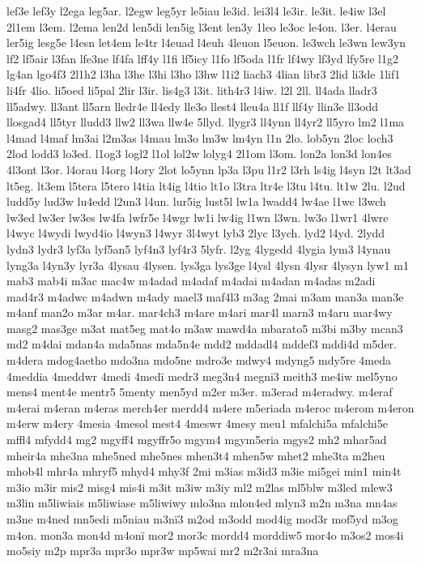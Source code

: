 {lef3e
lef3y
l2ega
leg5ar.
l2egw
leg5yr
le5iau
le3id.
lei3l4
le3ir.
le3it.
le4iw
l3el
2l1em
l3em.
l2ema
len2d
len5di
len5ig
l3ent
len3y
1leo
le3oc
le4on.
l3er.
l4erau
ler5ig
lesg5e
l4esn
let4em
le4tr
l4euad
l4euh
4leuon
l5euon.
le3wch
le3wn
lew3yn
lf2
lf5air
l3fan
lfe3ne
lf4fa
lff4y
l1fi
lf5icy
l1fo
lf5oda
l1fr
lf4wy
lf3yd
lfy5re
l1g2
lg4an
lgo4f3
2l1h2
l3ha
l3he
l3hi
l3ho
l3hw
l1i2
liach3
4lian
libr3
2lid
li3de
1lif1
li4fr
4lio.
li5oed
li5pal
2lir
l3ir.
lis4g3
l3it.
lith4r3
l4iw.
l2l
2ll.
ll4ada
lladr3
ll5adwy.
ll3ant
ll5arn
lledr4e
ll4edy
lle3o
llest4
lleu4a
ll1f
llf4y
llin3e
ll3odd
llosgad4
ll5tyr
lludd3
llw2
ll3wa
llw4e
5llyd.
llygr3
ll4ynn
ll4yr2
ll5yro
lm2
l1ma
l4mad
l4maf
lm3ai
l2m3as
l4mau
lm3o
lm3w
lm4yn
l1n
2lo.
lob5yn
2loc
loch3
2lod
lodd3
lo3ed.
l1og3
logl2
l1ol
lol2w
lolyg4
2l1om
l3om.
lon2a
lon3d
lon4es
4l3ont
l3or.
l4orau
l4org
l4ory
2lot
lo5ynn
lp3a
l3pu
l1r2
l3rh
ls4ig
l4syn
l2t
lt3ad
lt5eg.
lt3em
l5tera
l5tero
l4tia
lt4ig
l4tio
lt1o
l3tra
ltr4e
l3tu
l4tu.
lt1w
2lu.
l2ud
ludd5y
lud3w
lu4edd
l2un3
l4un.
lur5ig
lust5l
lw1a
lwadd4
lw4ae
l1wc
l3wch
lw3ed
lw3er
lw3es
lw4fa
lwfr5e
l4wgr
lw1i
lw4ig
l1wn
l3wn.
lw3o
l1wr1
4lwre
l4wyc
l4wydi
lwyd4io
l4wyn3
l4wyr
3l4wyt
lyb3
2lyc
l3ych.
lyd2
l4yd.
2lydd
lydn3
lydr3
lyf3a
lyf5an5
lyf4n3
lyf4r3
5lyfr.
l2yg
4lygedd
4lygia
lym3
l4ynau
lyng3a
l4yn3y
lyr3a
4lysau
4lysen.
lys3ga
lys3ge
l4ysl
4lysn
4lysr
4lysyn
lyw1
m1
mab3
mab4i
m3ac
mac4w
m4adad
m4adaf
m4adai
m4adan
m4adas
m2adi
mad4r3
m4adwc
m4adwn
m4ady
mael3
maf4l3
m3ag
2mai
m3am
man3a
man3e
m4anf
man2o
m3ar
m4ar.
mar4ch3
m4are
m4ari
mar4l
marn3
m4aru
mar4wy
masg2
mas3ge
m3at
mat5eg
mat4o
m3aw
mawd4a
mbarato5
m3bi
m3by
mcan3
md2
m4dai
mdan4a
mda5nas
mda5n4e
mdd2
mddadl4
mddef3
mddi4d
m5der.
m4dera
mdog4aetho
mdo3na
mdo5ne
mdro3e
mdwy4
mdyng5
mdy5re
4meda
4meddia
4meddwr
4medi
4medï
medr3
meg3n4
megni3
meith3
me4iw
mel5yno
mens4
ment4e
mentr5
5menty
men5yd
m2er
m3er.
m3erad
m4eradwy.
m4eraf
m4erai
m4eran
m4eras
merch4er
merdd4
m4ere
m5eriada
m4eroc
m4erom
m4eron
m4erw
m4ery
4mesia
4mesol
mest4
4meswr
4mesy
meu1
mfalchi5a
mfalchi5e
mffl4
mfydd4
mg2
mgyff4
mgyffr5o
mgym4
mgym5eria
mgys2
mh2
mhar5ad
mheir4a
mhe3na
mhe5ned
mhe5nes
mhen3t4
mhen5w
mhet2
mhe3ta
m2heu
mhob4l
mhr4a
mhryf5
mhyd4
mhy3f
2mi
m3ias
m3id3
m3ie
mi5gei
min1
min4t
m3io
m3ir
mis2
misg4
mis4i
m3it
m3iw
m3iy
ml2
m2las
ml5blw
m3led
mlew3
m3lin
m5liwiais
m5liwiase
m5liwiwy
mlo3na
mlon4ed
mlyn3
m2n
m3na
mn4as
m3ne
m4ned
mn5edi
m5niau
m3nï3
m2od
m3odd
mod4ig
mod3r
mof5yd
m3og
m4on.
mon3a
mon4d
m4onï
mor2
mor3c
mordd4
morddiw5
mor4o
m3os2
mos4i
mo5siy
m2p
mpr3a
mpr3o
mpr3w
mp5wai
mr2
m2r3ai
mra3na
}
